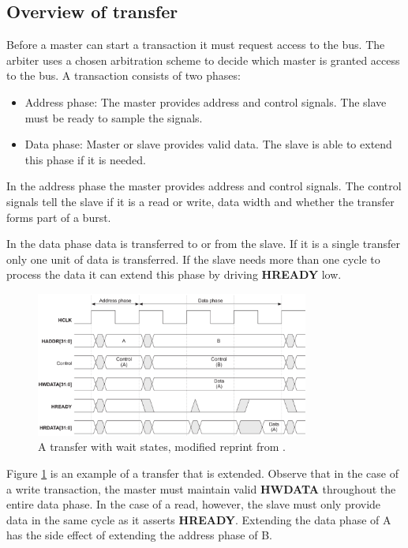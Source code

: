 \subsection{Overview of transfer}
Before a master can start a transaction it must request access to the bus. The arbiter uses a chosen arbitration scheme to decide which master is granted access
to the bus. A transaction consists of two phases: \\
\begin{itemize}
 \item Address phase: The master provides address and control signals. The slave must be ready to sample the signals. 
 \item Data phase: Master or slave provides valid data. The slave is able to extend this phase if it is needed. 
\end{itemize}

In the address phase the master provides address and control signals. The control signals tell the slave if it is a read or write, data width and whether the
transfer forms part of a burst. \par
In the data phase data is transferred to or from the slave. If it is a single transfer only one unit of data is transferred. If the slave needs more than
one cycle to process the data it can extend this phase by driving \textbf{HREADY} low. 

\begin{figure}[hbt]
    \begin{center}
        \includegraphics[width=0.8\textwidth]{figs/AHB/transfer.png}
    \end{center}
    \caption{A transfer with wait states, modified reprint from \cite{amba}.}
    \label{fig:transfer}
\end{figure}

Figure \ref{fig:transfer} is an example of a transfer that is extended. Observe that in the case of a write transaction, the master must maintain valid \textbf{HWDATA} throughout the entire data phase. In the case of a read, however, the slave must only provide data in the same cycle as it asserts \textbf{HREADY}. Extending the data phase of A has the side effect of extending the address phase of B.  


